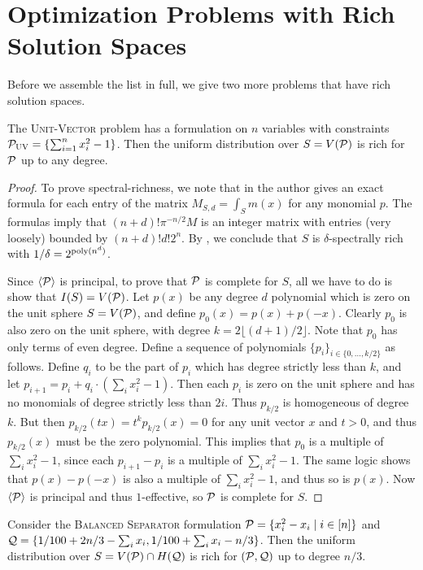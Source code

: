 \section{Optimization Problems with Rich Solution Spaces}
Before we assemble the list in full, we give two more problems that have rich solution spaces.
\begin{lemma}
The \textsc{Unit-Vector} problem has a formulation on $n$ variables with constraints $\mathcal P_{\textsc{UV}} = \{\sum_{i=1}^n x_i^2 - 1\}$. Then the uniform distribution over $S = V(\mathcal P)$ is rich for $\mathcal P$ up to any degree. 
\end{lemma}
\begin{proof}
To prove spectral-richness, we note that in \cite{Foll01} the author gives an exact formula for each entry of the matrix $M_{S,d} = \int_{S} m(x)$ for any monomial $p$. The formulas imply that $(n+d)!\pi^{-n/2} M$ is an integer matrix with entries (very loosely) bounded by $(n+d)!d!2^n$. By , we conclude that $S$ is $\delta$-spectrally rich with $1/\delta = 2^{\operatorname{poly}(n^d)}$.

Since $\langle \mathcal P \rangle$ is principal, to prove that $\mathcal P$ is complete for $S$, all we have to do is show that $I(S) = V(\mathcal P)$. Let $p(x)$ be any degree $d$ polynomial which is zero on the unit sphere $S = V(\mathcal P)$, and define $p_0(x) = p(x) + p(-x)$. Clearly $p_0$ is also zero on the unit sphere, with degree $k = 2\lfloor (d+1)/2 \rfloor$. Note that $p_0$ has only terms of even degree. 
%
Define a sequence of polynomials $\{p_i\}_{i \in \{0,\ldots, k/2\}}$ as follows.
Define $q_i$ to be the part of $p_i$ which has degree strictly less than $k$, and let $p_{i+1} = p_i + q_i\cdot(\sum_i x_i^2 - 1)$. Then each $p_i$ is zero on the unit sphere and has no monomials of degree strictly less than $2i$. Thus $p_{k/2}$ is homogeneous of degree $k$. But then $p_{k/2}(tx) = t^kp_{k/2}(x) = 0$ for any unit vector $x$ and $t > 0$, and thus $p_{k/2}(x)$ must be the zero polynomial. This implies that $p_0$ is a multiple of $\sum_i x_i^2 - 1$, since each $p_{i+1} - p_i$ is a multiple of $\sum_i x_i^2 -1$. The same logic shows that $p(x) - p(-x)$ is also a multiple of $\sum_i x_i^2 - 1$, and thus so is $p(x)$. Now $\langle \mathcal P\rangle$ is principal and thus $1$-effective, so $\mathcal P$ is complete for $S$. 
\end{proof}
\begin{lemma}
Consider the \textsc{Balanced Separator} formulation $\mathcal P = \{x_i^2 - x_i\mid i \in [n]\}$ and $\mathcal Q = \{1/100 + 2n/3 - \sum_i x_i, 1/100 + \sum_i x_i - n/3\}$. Then the uniform distribution over $S = V(\mathcal P) \cap H(\mathcal Q)$ is rich for $(\mathcal P, \mathcal Q)$ up to degree $n/3$.
\end{lemma}

